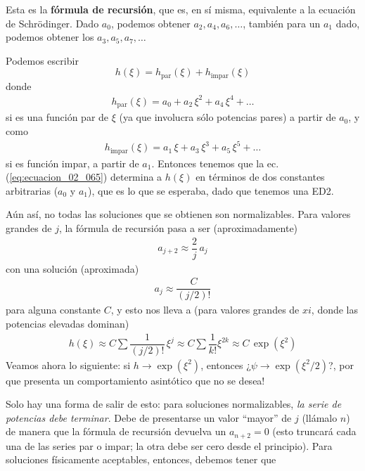 Esta es la \textbf{fórmula de recursión}, que es, en sí misma, equivalente a la ecuación de Schrödinger. Dado $a_{0}$, podemos obtener $a_{2}, a_{4}, a_{6}, \ldots$, también para un $a_{1}$ dado, podemos obtener los $a_{3}, a_{5}, a_{7}, \ldots$
\par
Podemos escribir
\begin{equation}
h (\xi) = h_{\text{par}} (\xi) + h_{\text{impar}} (\xi)
\label{eq:ecuacion_02_066}
\end{equation}
donde
\begin{align*}
h_{\text{par}} (\xi) = a_{0} + a_{2} \, \xi^{2} + a_{4} \, \xi^{4} + \ldots
\end{align*}
si es una función par de $\xi$ (ya que involucra sólo potencias pares) a partir de $a_{0}$, y como
\begin{align*}
h_{\text{impar}} (\xi) = a_{1} \, \xi + a_{3} \, \xi^{3} + a_{5} \, \xi^{5} + \ldots
\end{align*}
si es función impar, a partir de $a_{1}$. Entonces tenemos que la ec. (\ref{eq:ecuacion_02_065}) determina a $h(\xi)$ en términos de dos constantes arbitrarias ($a_{0}$ y $a_{1}$), que es lo que se esperaba, dado que tenemos una ED2.
\par
Aún así, no todas las soluciones que se obtienen son normalizables. Para valores grandes de $j$, la fórmula de recursión pasa a ser (aproximadamente)
\begin{align*}
a_{j+2} \approx \dfrac{2}{j} \, a_{j}
\end{align*}
con una solución (aproximada)
\begin{align*}
a_{j} \approx \dfrac{C}{(j/2)!}
\end{align*}
para alguna constante $C$, y esto nos lleva a (para valores grandes de $xi$, donde las potencias elevadas dominan)
\begin{align*}
h (\xi) \approx C \sum \dfrac{1}{(j/2)!} \, \xi^{j} \approx C \sum \dfrac{1}{k!} \xi^{2 k} \approx C \, \exp \left( \xi^{2} \right)
\end{align*}
Veamos ahora lo siguiente: si $h \to \exp \left( \xi^{2} \right)$, entonces ¿$\psi \to \exp \left( \xi^{2}/2 \right)$?, por que presenta un comportamiento asintótico que no se desea!
\par
Solo hay una forma de salir de esto: para soluciones normalizables, \textit{la serie de potencias debe terminar}. Debe de presentarse un valor \enquote{mayor} de $j$ (llámalo $n$) de manera que la fórmula de recursión devuelva un $a_{n+2} = 0$ (esto truncará cada una de las series par o impar; la otra debe ser cero desde el principio). Para soluciones físicamente aceptables, entonces, debemos tener que
